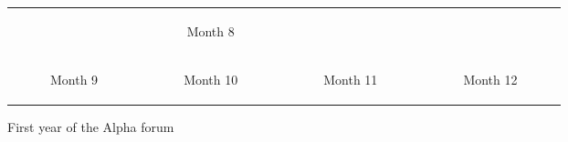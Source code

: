 \begin{minipage}[t]{0.7\textwidth}
\begin{figure}[H]
\begin{adjustbox}{width=\textwidth, keepaspectratio}
\begin{tabular}{cccc}
\begin{subfigure}[b]{0.24\textwidth}
          \end{subfigure} &
          \begin{subfigure}[b]{0.24\textwidth}
              \centering
              
              \caption{Month 8}
              \label{fig:month8}
          \end{subfigure} \\
          \begin{subfigure}[b]{0.24\textwidth}
              \centering
              
              \caption{Month 9}
              \label{fig:month9}
          \end{subfigure} &
          \begin{subfigure}[b]{0.24\textwidth}
              \centering
              
              \caption{Month 10}
              \label{fig:month10}
          \end{subfigure} &
          \begin{subfigure}[b]{0.24\textwidth}
              \centering
              
              \caption{Month 11}
              \label{fig:month11}
          \end{subfigure} &
          \begin{subfigure}[b]{0.24\textwidth}
              \centering
              
              \caption{Month 12}
              \label{fig:month12}
          \end{subfigure}
      \end{tabular}
  \end{adjustbox}
  \caption{First year of the Alpha forum}
  \label{fig:monthlyGraphs}
\end{figure}
\end{minipage}
\hfill
